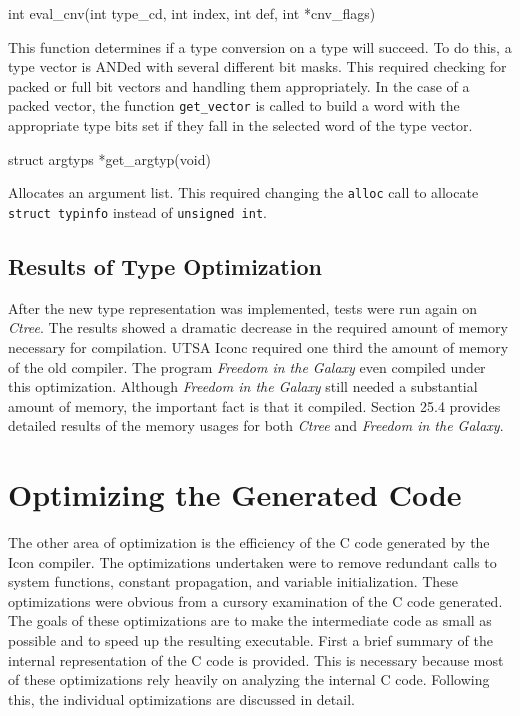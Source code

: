 {\ttfamily\mdseries
int eval\_cnv(int type\_cd, int index, int def, int *cnv\_flags)}

This function determines if a type conversion on a type will
succeed. To do this, a type vector is ANDed with several different bit
masks. This required checking for packed or full bit vectors and
handling them appropriately. In the case of a packed vector, the
function \texttt{get\_vector} is called to build a word with the
appropriate type bits set if they fall in the selected word of the
type vector.

{\ttfamily\mdseries
struct argtyps *get\_argtyp(void)}

Allocates an argument list. This required changing the
\texttt{alloc} call to allocate \texttt{struct typinfo} instead of
\texttt{unsigned int}.

\subsection{Results of Type Optimization}

After the new type representation was implemented, tests were run
again on \textit{Ctree}. The results showed a dramatic decrease in the
required amount of memory necessary for compilation. UTSA Iconc
required one third the amount of memory of the old compiler. The
program \textit{Freedom in the Galaxy} even compiled under this
optimization.  Although \textit{Freedom in the Galaxy} still needed a
substantial amount of memory, the important fact is that it
compiled. Section 25.4 provides detailed results of the memory
usages for both \textit{Ctree} and \textit{Freedom in the Galaxy}.

\section{Optimizing the Generated Code}

The other area of optimization is the efficiency of the C code
generated by the Icon compiler. The optimizations undertaken were to
remove redundant calls to system functions, constant propagation, and
variable initialization. These optimizations were obvious from a
cursory examination of the C code generated. The goals of these
optimizations are to make the intermediate code as small as possible
and to speed up the resulting executable. First a brief summary of
the internal representation of the C code is provided. This is
necessary because most of these optimizations rely heavily on
analyzing the internal C code. Following this, the individual
optimizations are discussed in detail.

